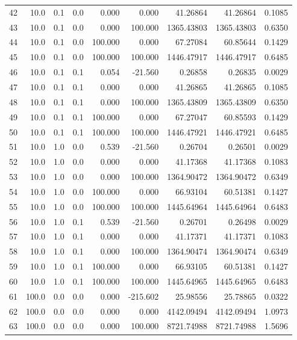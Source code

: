 \begin{longtable}{rrrrrrrrr}
    42 & 10.0 & 0.1 & 0.0 & 0.000 & 0.000 & 41.26864 & 41.26864 & 0.1085 \\
    43 & 10.0 & 0.1 & 0.0 & 0.000 & 100.000 & 1365.43803 & 1365.43803 & 0.6350 \\
    44 & 10.0 & 0.1 & 0.0 & 100.000 & 0.000 & 67.27084 & 60.85644 & 0.1429 \\
    45 & 10.0 & 0.1 & 0.0 & 100.000 & 100.000 & 1446.47917 & 1446.47917 & 0.6485 \\
    46 & 10.0 & 0.1 & 0.1 & 0.054 & -21.560 & 0.26858 & 0.26835 & 0.0029 \\
    47 & 10.0 & 0.1 & 0.1 & 0.000 & 0.000 & 41.26865 & 41.26865 & 0.1085 \\
    48 & 10.0 & 0.1 & 0.1 & 0.000 & 100.000 & 1365.43809 & 1365.43809 & 0.6350 \\
    49 & 10.0 & 0.1 & 0.1 & 100.000 & 0.000 & 67.27047 & 60.85593 & 0.1429 \\
    50 & 10.0 & 0.1 & 0.1 & 100.000 & 100.000 & 1446.47921 & 1446.47921 & 0.6485 \\
    51 & 10.0 & 1.0 & 0.0 & 0.539 & -21.560 & 0.26704 & 0.26501 & 0.0029 \\
    52 & 10.0 & 1.0 & 0.0 & 0.000 & 0.000 & 41.17368 & 41.17368 & 0.1083 \\
    53 & 10.0 & 1.0 & 0.0 & 0.000 & 100.000 & 1364.90472 & 1364.90472 & 0.6349 \\
    54 & 10.0 & 1.0 & 0.0 & 100.000 & 0.000 & 66.93104 & 60.51381 & 0.1427 \\
    55 & 10.0 & 1.0 & 0.0 & 100.000 & 100.000 & 1445.64964 & 1445.64964 & 0.6483 \\
    56 & 10.0 & 1.0 & 0.1 & 0.539 & -21.560 & 0.26701 & 0.26498 & 0.0029 \\
    57 & 10.0 & 1.0 & 0.1 & 0.000 & 0.000 & 41.17371 & 41.17371 & 0.1083 \\
    58 & 10.0 & 1.0 & 0.1 & 0.000 & 100.000 & 1364.90474 & 1364.90474 & 0.6349 \\
    59 & 10.0 & 1.0 & 0.1 & 100.000 & 0.000 & 66.93105 & 60.51381 & 0.1427 \\
    60 & 10.0 & 1.0 & 0.1 & 100.000 & 100.000 & 1445.64965 & 1445.64965 & 0.6483 \\
    61 & 100.0 & 0.0 & 0.0 & 0.000 & -215.602 & 25.98556 & 25.78865 & 0.0322 \\
    62 & 100.0 & 0.0 & 0.0 & 0.000 & 0.000 & 4142.09494 & 4142.09494 & 1.0973 \\
    63 & 100.0 & 0.0 & 0.0 & 0.000 & 100.000 & 8721.74988 & 8721.74988 & 1.5696 \\

\end{longtable}
